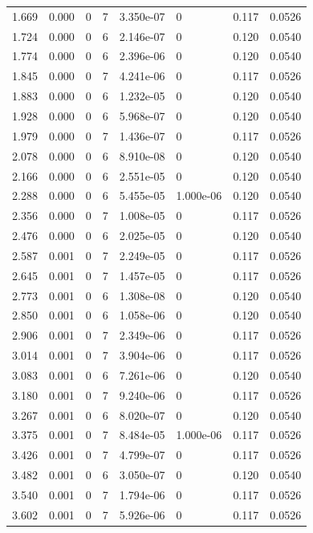 \documentclass[preview]{standalone}
\begin{document}
{{\begin{tabular}{L{1.2cm}C{1.2cm} C{0.3cm}C{0.5cm} C{1.4cm}C{1.4cm} C{1.4cm}C{1.4cm}}
  1.669  &  0.000  & 0     &  7 &  3.350e-07  & 0  & 0.117 &  0.0526   \\ 
  1.724  &  0.000  & 0     &  6 &  2.146e-07  & 0  & 0.120 &  0.0540   \\ 
  1.774  &  0.000  & 0     &  6 &  2.396e-06  & 0  & 0.120 &  0.0540   \\ 
  1.845  &  0.000  & 0     &  7 &  4.241e-06  & 0  & 0.117 &  0.0526   \\ 
  1.883  &  0.000  & 0     &  6 &  1.232e-05  & 0  & 0.120 &  0.0540   \\ 
  1.928  &  0.000  & 0     &  6 &  5.968e-07  & 0  & 0.120 &  0.0540   \\ 
  1.979  &  0.000  & 0     &  7 &  1.436e-07  & 0  & 0.117 &  0.0526   \\ 
  2.078  &  0.000  & 0     &  6 &  8.910e-08  & 0  & 0.120 &  0.0540   \\ 
  2.166  &  0.000  & 0     &  6 &  2.551e-05  & 0  & 0.120 &  0.0540   \\ 
  2.288  &  0.000  & 0     &  6 &  5.455e-05  & 1.000e-06  & 0.120 &  0.0540   \\ 
  2.356  &  0.000  & 0     &  7 &  1.008e-05  & 0  & 0.117 &  0.0526   \\ 
  2.476  &  0.000  & 0     &  6 &  2.025e-05  & 0  & 0.120 &  0.0540   \\ 
  2.587  &  0.001  & 0     &  7 &  2.249e-05  & 0  & 0.117 &  0.0526   \\ 
  2.645  &  0.001  & 0     &  7 &  1.457e-05  & 0  & 0.117 &  0.0526   \\ 
  2.773  &  0.001  & 0     &  6 &  1.308e-08  & 0  & 0.120 &  0.0540   \\ 
  2.850  &  0.001  & 0     &  6 &  1.058e-06  & 0  & 0.120 &  0.0540   \\ 
  2.906  &  0.001  & 0     &  7 &  2.349e-06  & 0  & 0.117 &  0.0526   \\ 
  3.014  &  0.001  & 0     &  7 &  3.904e-06  & 0  & 0.117 &  0.0526   \\ 
  3.083  &  0.001  & 0     &  6 &  7.261e-06  & 0  & 0.120 &  0.0540   \\ 
  3.180  &  0.001  & 0     &  7 &  9.240e-06  & 0  & 0.117 &  0.0526   \\ 
  3.267  &  0.001  & 0     &  6 &  8.020e-07  & 0  & 0.120 &  0.0540   \\ 
  3.375  &  0.001  & 0     &  7 &  8.484e-05  & 1.000e-06  & 0.117 &  0.0526   \\ 
  3.426  &  0.001  & 0     &  7 &  4.799e-07  & 0  & 0.117 &  0.0526   \\ 
  3.482  &  0.001  & 0     &  6 &  3.050e-07  & 0  & 0.120 &  0.0540   \\ 
  3.540  &  0.001  & 0     &  7 &  1.794e-06  & 0  & 0.117 &  0.0526   \\ 
  3.602  &  0.001  & 0     &  7 &  5.926e-06  & 0  & 0.117 &  0.0526   \\ 
\hline 
\end{tabular} 

}}
\end{document}
